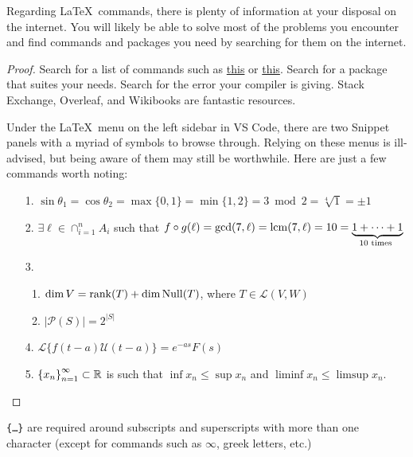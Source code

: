 \documentclass{article} 		%
\begin{document}
\begin{theorem*}
	Regarding \LaTeX\ commands, there is plenty of information at your disposal on the internet. You will likely be able to solve most of the problems you encounter and find commands and packages you need by searching for them on the internet. 
\end{theorem*}
\begin{proof}
	Search for a list of commands such as \href{https://oeis.org/wiki/List_of_LaTeX_mathematical_symbols}{this} or \href{http://tug.ctan.org/info/symbols/comprehensive/symbols-a4.pdf}{this}. Search for a package that suites your needs. Search for the error your compiler is giving. Stack Exchange, Overleaf, and Wikibooks are fantastic resources. \par
	Under the \LaTeX\ menu on the left sidebar in VS Code, there are two Snippet panels with a myriad of symbols to browse through. Relying on these menus is ill-advised, but being aware of them may still be worthwhile. Here are just a few commands worth noting: 
	\begin{enumerate}
		\item[1.]
		$\sin\theta_1 = \cos\theta_2 = \max\{0,1\} = \min\{1,2\} = 3 \bmod 2 = \sqrt[4]{1} = \pm 1$

		\item[2.]
		$\exists \ell \in \cap_{i=1}^n A_i$ such that $f \circ g(\ell) = \gcd(7,\ell) = \mathrm{lcm}(7,\ell) = 10 = \underbrace{1 + \cdots + 1}_{10 \text{ times}\ }$

		\item[3.]
		\begin{enumerate}
			\item%
			$\dim V = \mathrm{rank}(T) + \dim\operatorname{Null}(T)$, where $T \in \mathcal{L}(V,W)$

			\item%
			$|\mathcal{P}(S)| = 2^{|S|}$
		\end{enumerate}

		\item[4.]
		$\mathscr{L}\{f(t - a)\mathscr{U}(t - a)\}=e^{-as}F(s)$ %

		\item[5.]
		$\left\{x_n\right\}_{n=1}^{\infty} \subset \mathbb{R}$ is such that $\inf x_n \le \sup x_n$ and $\liminf x_n \le \limsup x_n$. \qedhere %
	\end{enumerate}
\end{proof}

\begin{notation}
	\texttt{\{\dots\}} are required around subscripts and superscripts with more than one character (except for commands such as $\infty$, greek letters, etc.)  
\end{notation}
\end{document}
